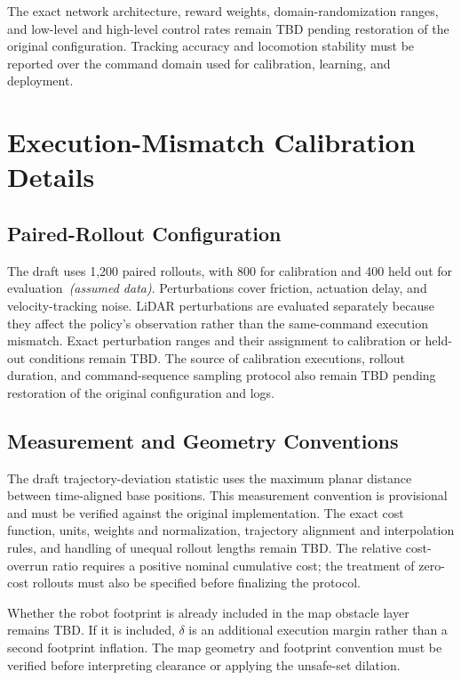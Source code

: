 \documentclass{article}
\begin{document}
The exact network architecture, reward weights, domain-randomization ranges, and
low-level and high-level control rates remain \textsc{TBD} pending restoration of
the original configuration. Tracking accuracy and locomotion stability must be
reported over the command domain used for calibration, learning, and deployment.

\section{Execution-Mismatch Calibration Details}
\label{app:calibration_details}
\subsection{Paired-Rollout Configuration}
The draft uses 1,200 paired rollouts, with 800 for calibration and 400 held out for
evaluation~\textit{(assumed data)}. Perturbations cover friction, actuation delay,
and velocity-tracking noise. LiDAR perturbations are evaluated separately because
they affect the policy's observation rather than the same-command execution
mismatch. Exact perturbation ranges and their assignment to calibration or
held-out conditions remain \textsc{TBD}. The source of calibration executions,
rollout duration, and command-sequence sampling protocol also remain \textsc{TBD}
pending restoration of the original configuration and logs.

\subsection{Measurement and Geometry Conventions}
The draft trajectory-deviation statistic uses the maximum planar distance between
time-aligned base positions. This measurement convention is provisional and must
be verified against the original implementation. The exact cost function, units,
weights and normalization, trajectory alignment and interpolation rules, and
handling of unequal rollout lengths remain \textsc{TBD}. The relative cost-overrun
ratio requires a positive nominal cumulative cost; the treatment of zero-cost
rollouts must also be specified before finalizing the protocol.

Whether the robot footprint is already included in the map obstacle layer remains
\textsc{TBD}. If it is included, $\delta$ is an additional execution margin rather
than a second footprint inflation. The map geometry and footprint convention must
be verified before interpreting clearance or applying the unsafe-set dilation.
\end{document}
